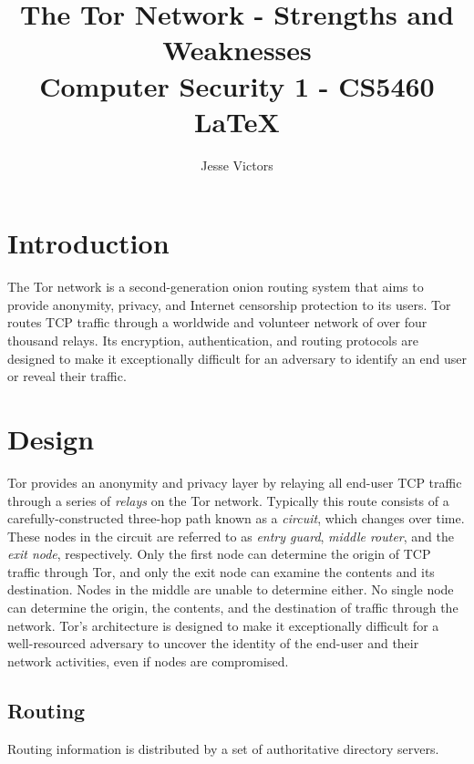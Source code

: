 \documentclass[journal]{IEEEtran}
\begin{document}
\title{The Tor Network - Strengths and Weaknesses \\ \Large Computer Security 1 - CS5460 \\ \LaTeX{}}
\author{Jesse Victors}

\maketitle

\section{Introduction}

The Tor network is a second-generation onion routing system that aims to provide anonymity, privacy, and Internet censorship protection to its users. Tor routes TCP traffic through a worldwide and volunteer network of over four thousand relays. Its encryption, authentication, and routing protocols are designed to make it exceptionally difficult for an adversary to identify an end user or reveal their traffic.

\section{Design}

Tor provides an anonymity and privacy layer by relaying all end-user TCP traffic through a series of \textit{relays} on the Tor network. Typically this route consists of a carefully-constructed three-hop path known as a \textit{circuit}, which changes over time. These nodes in the circuit are referred to as \textit{entry guard}, \textit{middle router}, and the \textit{exit node}, respectively. Only the first node can determine the origin of TCP traffic through Tor, and only the exit node can examine the contents and its destination. Nodes in the middle are unable to determine either. No single node can determine the origin, the contents, and the destination of traffic through the network. Tor's architecture is designed to make it exceptionally difficult for a well-resourced adversary to uncover the identity of the end-user and their network activities, even if nodes are compromised.\cite{McCoy2008}

\subsection{Routing}

Routing information is distributed by a set of authoritative directory servers.\cite{McCoy2008}
\end{document}

